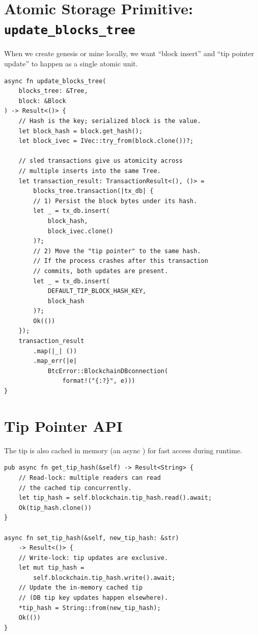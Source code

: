 \section{Atomic Storage Primitive: \texttt{update\_blocks\_tree}}
\label{sec:ch11-atomic-primitive}

When we create genesis or mine locally, we want ``block insert'' and ``tip pointer update'' to happen as a single atomic unit.

\begin{listing}[htbp]
\caption{Atomic insert + tip update}
\label{lst:ch11-atomic}
\begin{verbatim}
async fn update_blocks_tree(
    blocks_tree: &Tree,
    block: &Block
) -> Result<()> {
    // Hash is the key; serialized block is the value.
    let block_hash = block.get_hash();
    let block_ivec = IVec::try_from(block.clone())?;

    // sled transactions give us atomicity across
    // multiple inserts into the same Tree.
    let transaction_result: TransactionResult<(), ()> =
        blocks_tree.transaction(|tx_db| {
        // 1) Persist the block bytes under its hash.
        let _ = tx_db.insert(
            block_hash,
            block_ivec.clone()
        )?;
        // 2) Move the "tip pointer" to the same hash.
        // If the process crashes after this transaction
        // commits, both updates are present.
        let _ = tx_db.insert(
            DEFAULT_TIP_BLOCK_HASH_KEY,
            block_hash
        )?;
        Ok(())
    });
    transaction_result
        .map(|_| ())
        .map_err(|e|
            BtcError::BlockchainDBconnection(
                format!("{:?}", e)))
}
\end{verbatim}
\end{listing}

\section{Tip Pointer API}
\label{sec:ch11-tip-api}

The tip is also cached in memory (an async ) for fast access during runtime.

\begin{listing}[htbp]
\caption{Tip pointer helpers}
\label{lst:ch11-tip-helpers}
\begin{verbatim}
pub async fn get_tip_hash(&self) -> Result<String> {
    // Read-lock: multiple readers can read
    // the cached tip concurrently.
    let tip_hash = self.blockchain.tip_hash.read().await;
    Ok(tip_hash.clone())
}

async fn set_tip_hash(&self, new_tip_hash: &str)
    -> Result<()> {
    // Write-lock: tip updates are exclusive.
    let mut tip_hash =
        self.blockchain.tip_hash.write().await;
    // Update the in-memory cached tip
    // (DB tip key updates happen elsewhere).
    *tip_hash = String::from(new_tip_hash);
    Ok(())
}
\end{verbatim}
\end{listing}

